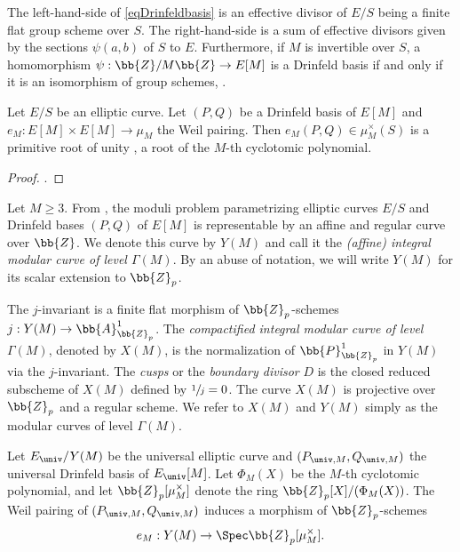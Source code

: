 \begin{remark}
The left-hand-side of \eqref{eqDrinfeldbasis} is an effective divisor of $E/S$ being a finite flat group scheme over $S$. The right-hand-side is a sum of effective divisors given by the sections $\psi(a,b)$ of $S$ to $E$. Furthermore, if $M$ is invertible over $S$, a homomorphism $\psi: \bb{Z}/M\bb{Z}\to E[M]$ is a Drinfeld basis if and only if it is an isomorphism of group schemes, \cf \cite[Lem.\,1.5.3]{katz1985arithmetic}.
\end{remark}

\begin{prop}
Let $E/S$ be an elliptic curve. Let $(P,Q)$ be a Drinfeld basis of $E[M]$ and $e_M: E[M]\times E[M]\to \mu_M$ the Weil pairing. Then $e_M(P,Q)\in \mu_M^\times(S)$ is a primitive root of unity , \ie a root of the $M$-th cyclotomic polynomial.
\end{prop}

\begin{proof}
\cite[Th.\,5.6.3]{katz1985arithmetic}.
\end{proof}

Let $M\geq 3$. From \cite[Th.\,5.1.1 \& Sch.\,4.7.0]{katz1985arithmetic}, the moduli problem parametrizing elliptic curves $E/S$ and Drinfeld bases $(P,Q)$ of $E[M]$ is representable by an affine and regular curve over $\bb{Z}$. We denote this curve by $Y(M)$ and call it the \textit{(affine) integral modular curve of level $\Gamma(M)$}. By an abuse of notation, we will write $Y(M)$ for its scalar extension to $\bb{Z}_p$.

The $j$-invariant is a finite flat morphism of $\bb{Z}_p$-schemes $j:Y(M)\to \bb{A}^1_{\bb{Z}_p}$. The \textit{compactified integral modular curve of level $\Gamma(M)$}, denoted by $X(M)$, is the normalization of $\bb{P}^1_{\bb{Z}_p}$ in $Y(M)$ via the $j$-invariant. The \textit{cusps} or the \textit{boundary divisor} $D$ is the closed reduced subscheme of $X(M)$ defined by $\sfrac{1}{j}=0$. The curve $X(M)$ is projective over~$\bb{Z}_p$ and a regular scheme.
We refer to $X(M)$ and $Y(M)$ simply as the modular curves of level $\Gamma(M)$.

Let $E_{\univ}/Y(M)$ be the universal elliptic curve and $(P_{\univ,M},Q_{\univ,M})$ the universal Drinfeld basis of $E_{\univ}[M]$. Let $\Phi_{M}(X)$ be the $M$-th cyclotomic polynomial, and let $\bb{Z}_p[\mu^{\times}_{M}]$ denote the ring $\bb{Z}_p[X]/(\Phi_{M}(X))$. The Weil pairing of $(P_{\univ,M},Q_{\univ,M})$ induces a morphism of $\bb{Z}_p$-schemes
\[
e_M:Y(M)\to \Spec \bb{Z}_p[\mu_{M}^{\times}].
\]

